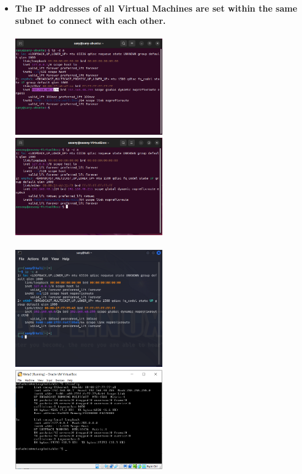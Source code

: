 \documentclass{article}
\begin{document}
\begin{itemize}
    \item \textbf{The IP addresses of all Virtual Machines are set within the same subnet to connect with each other.}\\\\
    \includegraphics[width=0.5\textwidth]{images/ubuntu2.0_ip.PNG}
    \includegraphics[width=0.5\textwidth]{images/ubuntu3.0_ip.PNG}\\\\
    \includegraphics[width=0.5\textwidth]{images/kali_linux_ip.PNG}
    \includegraphics[width=0.5\textwidth , height=0.29\textheight]{images/meta2_ip.PNG}
\end{itemize}
\end{document}
